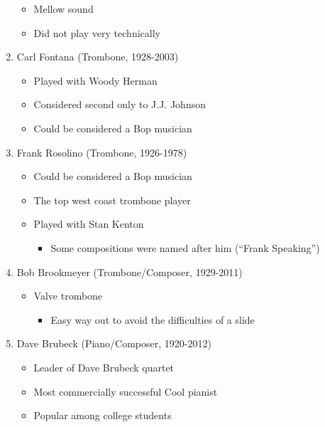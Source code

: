 \documentclass[]{article}
\providecommand{\tightlist}{%
  \setlength{\itemsep}{0pt}\setlength{\parskip}{0pt}}
\begin{document}
\begin{enumerate}
  \begin{itemize}
  \tightlist
  \item
    Mellow sound
  \item
    Did not play very technically
  \end{itemize}
\item
  Carl Fontana (Trombone, 1928-2003)

  \begin{itemize}
  \tightlist
  \item
    Played with Woody Herman
  \item
    Considered second only to J.J. Johnson
  \item
    Could be considered a Bop musician
  \end{itemize}
\item
  Frank Rosolino (Trombone, 1926-1978)

  \begin{itemize}
  \tightlist
  \item
    Could be considered a Bop musician
  \item
    The top west coast trombone player
  \item
    Played with Stan Kenton

    \begin{itemize}
    \tightlist
    \item
      Some compositions were named after him (``Frank Speaking'')
    \end{itemize}
  \end{itemize}
\item
  Bob Brookmeyer (Trombone/Composer, 1929-2011)

  \begin{itemize}
  \tightlist
  \item
    Valve trombone

    \begin{itemize}
    \tightlist
    \item
      Easy way out to avoid the difficulties of a slide
    \end{itemize}
  \end{itemize}
\item
  Dave Brubeck (Piano/Composer, 1920-2012)

  \begin{itemize}
  \tightlist
  \item
    Leader of Dave Brubeck quartet
  \item
    Most commercially successful Cool pianist
  \item
    Popular among college students


\end{itemize}
\end{enumerate}
\end{document}
